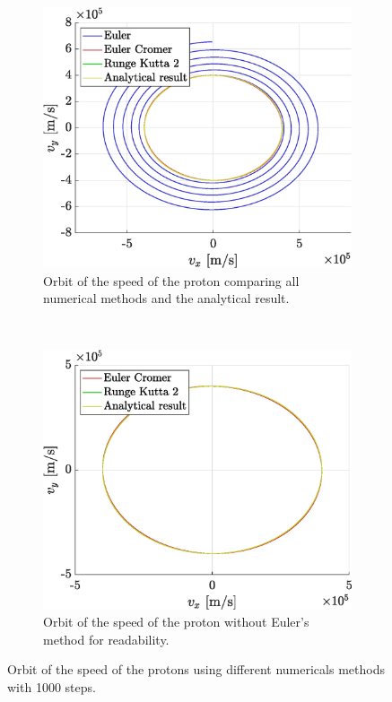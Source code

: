 \documentclass[a4paper,12pt,twoside]{article}
\begin{document}
\begin{figure}[h]
	\centering
	\begin{subfigure}[t]{0.45\textwidth}
	\includegraphics[width=\linewidth]{graphs/ex2_iii_speed_ALL.eps}
		\caption{Orbit of the speed of the proton comparing all numerical methods and the analytical result.}
		\label{fig:ex2-iii-speed-ALL}
	\end{subfigure}
	~
	\begin{subfigure}[t]{0.45\textwidth}
		\includegraphics[width=\linewidth]{graphs/ex2_iii_speed_NoEuler.eps}
		\caption{Orbit of the speed of the proton without Euler's method for readability.}
		\label{fig:ex2-iii-speed-NoEuler}
	\end{subfigure}
	
	\caption{Orbit of the speed of the protons using different numericals methods with \num{1000} steps.} %
	\label{fig:ex2-iii-speed}
\end{figure}
\end{document}
